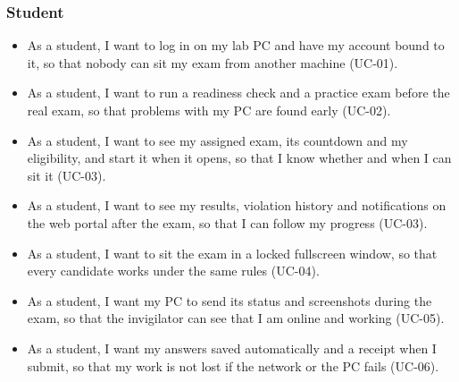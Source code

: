 \subsubsection{Student}
\begin{itemize}[nosep]
    \item As a student, I want to log in on my lab PC and have my account bound to it, so that nobody can sit my exam from another machine (UC-01).
    \item As a student, I want to run a readiness check and a practice exam before the real exam, so that problems with my PC are found early (UC-02).
    \item As a student, I want to see my assigned exam, its countdown and my eligibility, and start it when it opens, so that I know whether and when I can sit it (UC-03).
    \item As a student, I want to see my results, violation history and notifications on the web portal after the exam, so that I can follow my progress (UC-03).
    \item As a student, I want to sit the exam in a locked fullscreen window, so that every candidate works under the same rules (UC-04).
    \item As a student, I want my PC to send its status and screenshots during the exam, so that the invigilator can see that I am online and working (UC-05).
    \item As a student, I want my answers saved automatically and a receipt when I submit, so that my work is not lost if the network or the PC fails (UC-06).
\end{itemize}

